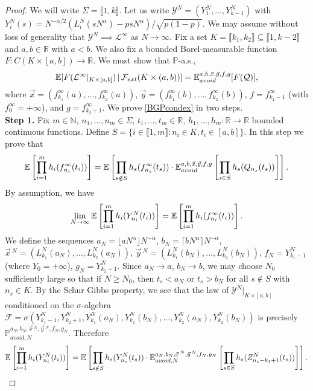 \begin{proof}
	We will write $\Sigma = \llbracket 1,k\rrbracket$. Let us write $\mathcal{Y}^N = (Y^N_1,\dots,Y^N_{k-1})$ with $Y^N_i(s) = N^{-\alpha/2}(L^N_i(sN^\alpha)-psN^\alpha)/\sqrt{p(1-p)}$. We may assume without loss of generality that $\mathcal{Y}^N \implies \mathcal{L}^\infty$ as $N\to\infty$. Fix a set $K = \llbracket k_1,k_2\rrbracket \subseteq \llbracket 1, k-2\rrbracket$ and $a,b\in\mathbb{R}$ with $a<b$. We also fix a bounded Borel-measurable function $F:C(K\times[a,b])\to\mathbb{R}$. We must show that $\mathbb{P}$-a.s.,
	\begin{equation}\label{BGPcondex}
	\mathbb{E}[F(\mathcal{L}^\infty|_{K\times[a,b]})\,|\,\mathcal{F}_{ext}(K\times(a,b))] = \mathbb{E}^{a,b,\vec{x},\vec{y},f,g}_{avoid}[F(\mathcal{Q})],
	\end{equation}
	where $\vec{x} = (f^\infty_{k_1}(a),\dots,f^\infty_{k_2}(a))$, $\vec{y} = (f^\infty_{k_1}(b),\dots,f^\infty_{k_2}(b))$, $f=f^\infty_{k_1-1}$ (with $f^\infty_0 = +\infty$), and $g=f^\infty_{k_2+1}$. We prove \eqref{BGPcondex} in two steps.\\
	
	\noindent\textbf{Step 1. } Fix $m\in\mathbb{N}$, $n_1,\dots,n_m\in\Sigma$, $t_1,\dots,t_m\in\mathbb{R}$, $h_1,\dots,h_m : \mathbb{R}\to\mathbb{R}$ bounded continuous functions. Define $S = \{i\in\llbracket 1,m\rrbracket : n_i \in K, t_i \in [a,b]\}$. In this step we prove that
	\begin{equation}\label{BBcondexsplit}
	\mathbb{E}\left[\prod_{i=1}^m h_i(f^\infty_{n_i}(t_i))\right] = \mathbb{E}\left[\prod_{s\notin S} h_s(f^\infty_{n_s}(t_s))\cdot\mathbb{E}^{a,b,\vec{x},\vec{y},f,g}_{avoid}\left[\prod_{s\in S} h_s(Q_{n_s}(t_s))\right]\right].
	\end{equation}
	By assumption, we have
	\begin{equation}\label{BGPweak}
	\lim_{N\to\infty}\mathbb{E}\left[\prod_{i=1}^m h_i(Y^N_{n_i}(t_i))\right] = \mathbb{E}\left[\prod_{i=1}^m h_i(f^\infty_{n_i}(t_i))\right].
	\end{equation}
	We define the sequences $a_N = \lfloor aN^\alpha\rfloor N^{-\alpha}$, $b_N = \lceil bN^\alpha\rceil N^{-\alpha}$, $\vec{x}\,^N = (L_{k_1}^N(a_N),\dots,L_{k_2}^N(a_N))$, $\vec{y}\,^N = (L_{k_1}^N(b_N),\dots,L_{k_2}^N(b_N))$, $f_N = Y_{k_1-1}^N$ (where $Y_0 = +\infty$), $g_N = Y_{k_2+1}^N$. Since $a_N \to a$, $b_N\to b$, we may choose $N_0$ sufficiently large so that if $N\geq N_0$, then $t_s < a_N$ or $t_s > b_N$ for all $s\notin S$ with $n_s \in K$. By the Schur Gibbs property, we see that the law of $\mathcal{Y}^N|_{K\times[a,b]}$ conditioned on the $\sigma$-algebra $\mathcal{F} = \sigma\left(Y^N_{k_1-1}, Y^N_{k_2+1}, Y^N_{k_1}(a_N), Y^N_{k_1}(b_N),\dots,Y^N_{k_2}(a_N),Y^N_{k_2}(b_N)\right)$ is precisely $\mathbb{P}^{a_N,b_N,\vec{x}\,^N,\vec{y}\,^N,f_N,g_N}_{avoid,N}$. Therefore
	\begin{equation}\label{BBschur}
	\mathbb{E}\left[\prod_{i=1}^m h_i(Y^N_{n_i}(t_i))\right] = \mathbb{E}\left[\prod_{s\notin S} h_s(Y^N_{n_s}(t_s))\cdot\mathbb{E}^{a_N,b_N,\vec{x}\,^N,\vec{y}\,^N,f_N,g_N}_{avoid,N}\left[\prod_{s\in S} h_s(Z^N_{n_s-k_1+1}(t_s))\right]\right].
	\end{equation}
	

\end{proof}
